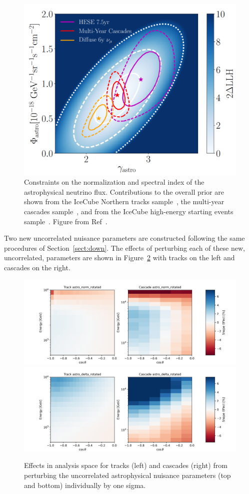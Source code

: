 \documentclass[main.tex]{subfiles}
\begin{document}
\begin{figure}
    \centering
    \includegraphics[width=0.6\linewidth]{figures/hese.png}
    \caption{Constraints on the normalization and spectral index of the astrophysical neutrino flux. Contributions to the overall prior are shown from the IceCube Northern tracks sample~\cite{stettner2019measurement}, the multi-year cascades sample~\cite{Aartsen_2020_cascades}, and from the IceCube high-energy starting events sample~\cite{2021hese}. Figure from Ref~\cite{Aartsen_2020_prd}.}\label{fig:hese}
\end{figure}

Two new uncorrelated nuisance parameters are constructed following the same procedures of Section~\ref{sect:down}. The effects of perturbing each of these new, uncorrelated, parameters are shown in Figure~\ref{fig:recoastro} with tracks on the left and cascades on the right.

\begin{figure}
    \centering
    \includegraphics[width=0.8\linewidth]{figures/systematics/astro_norm_rotated.png}\\
    \includegraphics[width=0.8\linewidth]{figures/systematics/astro_delta_rotated.png}
    \caption{Effects in analysis space for tracks (left) and cascades (right) from perturbing the uncorrelated astrophysical nuisance parameters (top and bottom) individually by one sigma. }\label{fig:recoastro}
\end{figure}
\end{document}

